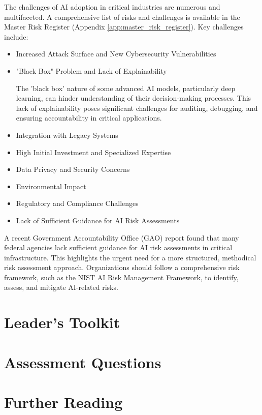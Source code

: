 The challenges of AI adoption in critical industries are numerous and multifaceted. A comprehensive list of risks and challenges is available in the Master Risk Register (Appendix \ref{app:master_risk_register}). Key challenges include:

\begin{itemize}
    \item Increased Attack Surface and New Cybersecurity Vulnerabilities
    \item "Black Box" Problem and Lack of Explainability

\begin{notebox}
The 'black box' nature of some advanced AI models, particularly deep learning, can hinder understanding of their decision-making processes. This lack of explainability poses significant challenges for auditing, debugging, and ensuring accountability in critical applications.
\end{notebox}
    \item Integration with Legacy Systems
    \item High Initial Investment and Specialized Expertise
    \item Data Privacy and Security Concerns
    \item Environmental Impact
    \item Regulatory and Compliance Challenges
    \item Lack of Sufficient Guidance for AI Risk Assessments
\end{itemize}

\begin{warningbox}
A recent Government Accountability Office (GAO) report found that many federal agencies lack sufficient guidance for AI risk assessments in critical infrastructure. This highlights the urgent need for a more structured, methodical risk assessment approach. Organizations should follow a comprehensive risk framework, such as the NIST AI Risk Management Framework, to identify, assess, and mitigate AI-related risks.
\end{warningbox}




\section{Leader's Toolkit}
\label{sec:ai_revolution_leaders_toolkit}

\section{Assessment Questions}
\label{sec:ai_revolution_assessment_questions}

\section{Further Reading}
\label{sec:ai_revolution_further_reading}